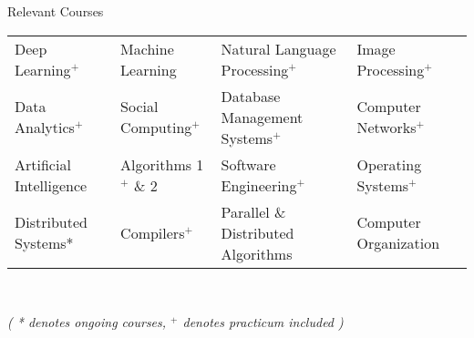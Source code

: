 \documentclass{resume} %
\begin{document}

\begin{rSection}{Relevant Courses}
\begin{tabular}{p{3.7cm} p{3.5cm} p{5.7cm} p{4.1cm}}
Deep Learning$^+$ & Machine Learning & Natural Language Processing$^+$ & Image Processing$^+$ \\
Data Analytics$^+$ & Social Computing$^+$ & Database Management Systems$^+$ & Computer Networks$^+$  \\
Artificial Intelligence & Algorithms 1$^+$ \& 2 & Software Engineering$^+$ & Operating Systems$^+$ \\
Distributed Systems* & Compilers$^+$ & Parallel \& Distributed Algorithms & Computer Organization\\
\end{tabular}\\
\centerline{\footnotesize \textit{ ( * denotes ongoing courses, $^+$ denotes practicum included )  }}
\end{rSection}

\end{document}
